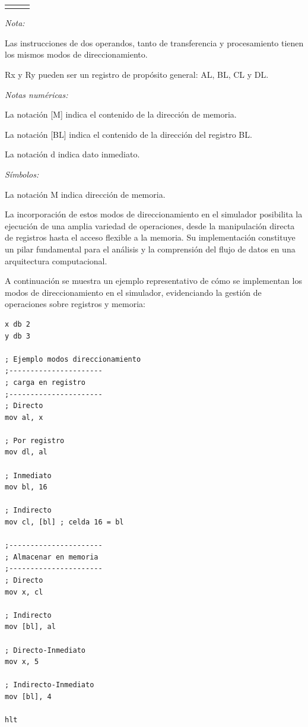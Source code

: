\documentclass[12pt,oneside]{templates/unerthesis}
\begin{document}
\begin{table}[!h]
{\begin{threeparttable}
\begin{tabular}[t]{>{\raggedright\arraybackslash}p{4cm}|>{\raggedright\arraybackslash}p{5cm}p{8cm}}
\addlinespace[10pt]
\bottomrule
\end{tabular}
\begin{tablenotes}
\item \textit{Nota: } 
\item Las instrucciones de dos operandos, tanto de transferencia y procesamiento tienen los mismos modos de direccionamiento.
\item Rx y Ry pueden ser un registro de propósito general: AL, BL, CL y DL.
\item \textit{Notas numéricas: } 
\item[1] La notación [M] indica el contenido de la dirección de memoria.
\item[2] La notación [BL] indica el contenido de la dirección del registro BL.
\item[3] La notación d indica dato inmediato.
\item \textit{Símbolos: } 
\item[*] La notación M indica dirección de memoria.
\end{tablenotes}
\end{threeparttable}}
\end{table}

La incorporación de estos modos de direccionamiento en el simulador posibilita la ejecución de una amplia variedad de operaciones, desde la manipulación directa de registros hasta el acceso flexible a la memoria. Su implementación constituye un pilar fundamental para el análisis y la comprensión del flujo de datos en una arquitectura computacional.

A continuación se muestra un ejemplo representativo de cómo se implementan los modos de direccionamiento en el simulador, evidenciando la gestión de operaciones sobre registros y memoria:

\begin{lstlisting}
x db 2 
y db 3

; Ejemplo modos direccionamiento
;----------------------
; carga en registro
;----------------------
; Directo
mov al, x

; Por registro
mov dl, al

; Inmediato
mov bl, 16

; Indirecto
mov cl, [bl] ; celda 16 = bl

;----------------------
; Almacenar en memoria
;----------------------
; Directo
mov x, cl

; Indirecto
mov [bl], al

; Directo-Inmediato
mov x, 5

; Indirecto-Inmediato
mov [bl], 4

hlt\end{lstlisting}
\end{document}
